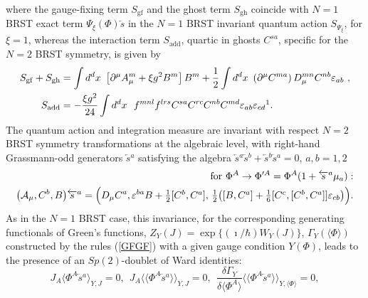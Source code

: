 \documentclass[10pt]{article}
\begin{document}
where the gauge-fixing term $S_{\mathrm{gf}}$ and the ghost term $S_{\mathrm{gh}}$
coincide with $N=1$ BRST exact term $\Psi_\xi(\Phi)\overleftarrow{s}$
in the $N=1$ BRST invariant quantum action
$S_{\Psi_\xi}$, for $\xi=1$, whereas the interaction term $S_{\mathrm{add}}$,
quartic in ghosts $C^{sa}$, specific for the $N=2$ BRST symmetry, is given by%
\begin{align}
S_{\mathrm{gf}}+  S_{\mathrm{gh}} &  = \int d^{d}x\ \left[    \partial^{\mu}A_{\mu
}^{m}  + {\xi g^2} B^{m}\right]  B^{m}+ \frac{1}{2}\int d^{d}x\ \left(  \partial^{\mu}%
C^{ma}\right)  D_{\mu}^{mn}C^{nb}\varepsilon_{ab}\ ,\label{Sgh}\\
S_{\mathrm{add}} &  =-\frac{\xi g^2}{ 24}\int d^{d}x\ \ f^{mnl}f^{lrs}C^{sa}%
C^{rc}C^{nb}C^{md}\varepsilon_{ab}\varepsilon_{cd}\footnotemark .  \label{Sadd}
\end{align}The quantum action and integration measure are invariant with respect $N=2$ BRST symmetry
transformations at the algebraic level, with right-hand Grassmann-odd generators
$\overleftarrow{s}{}^a$ satisfying the algebra
$\overleftarrow{s}{}^a\overleftarrow{s}{}^b+\overleftarrow{s}{}^b\overleftarrow{s}{}^a=0$, $a,b=1,2$
\begin{eqnarray}\hspace{-0.5em} &\hspace{-0.5em}&
\ \mathrm{for} \  \Phi^A \to \Phi^{\prime A} = \Phi^A(1+\overleftarrow{s}{}^a\mu_a): \nonumber \\
\hspace{-0.5em} &\hspace{-0.5em}&  \big(\mathcal{A}_\mu, C^b, B\big)\overleftarrow{s}{}^a  = \Big(D_\mu C^a, \varepsilon ^{ba}B+%
\textstyle\frac{1}{2}[C^{b}, C^{a}], \,  \textstyle\frac{1}{2}\big(
[B, C^{a}]+\frac{1}{6}[C^{c},[C^{b},C^{a}]]\varepsilon
_{cb}\big)\Big). \label{N2algBRST}
\end{eqnarray}
As in the $N=1$ BRST case, this invariance, for the corresponding generating functionals
of Green's functions, $Z_Y(J) = \exp \{(\imath / \hbar)W_Y(J)\}$, $\Gamma_Y(\langle\Phi\rangle)$
constructed by the rules (\ref{GFGF}) with a given gauge condition $Y(\Phi)$,
leads to the presence of an $Sp(2)$-doublet of Ward identities:
\begin{equation}\label{GFGFWIN2}
J_A\langle \Phi^A \overleftarrow{s}{}^a\rangle_{Y,J}=0, \ \ J_A\langle\langle \Phi^A \overleftarrow{s}{}^a\rangle\rangle_{Y,J}=0, \ \ \frac{\delta \Gamma_Y}{\delta \langle \Phi^A\rangle}\langle\langle \Phi^A \overleftarrow{s}{}^a\rangle\rangle_{Y, \langle \Phi\rangle} =0,
 \end{equation}
\end{document}
